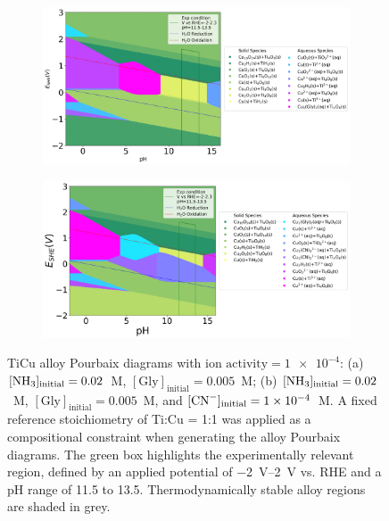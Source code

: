 \documentclass[journal=jacsat,manuscript=article]{achemso}
\begin{document}
\begin{figure}[htbp]
    \centering
    \begin{subfigure}[b]{0.45\textwidth}
        \subcaption{}\label{fig:TiCu_Pourbaix_NH3_Gly}
        \includegraphics[width=\textwidth]
        {Figures/alloy_pourbaix_diagrams/Ti_Cu_alloy_Ti0.5 Cu0.5_NH3=0.02M_Gly=0.005M_CN=0M_activity=1e-04M.png}
        \par\medskip
    \end{subfigure}
    \begin{subfigure}[b]{0.45\textwidth}
        \subcaption{}\label{fig:TiCu_Pourbaix_NH3_Gly_CN}
        \includegraphics[width=\textwidth]{Figures/alloy_pourbaix_diagrams/Ti_Cu_alloy_Ti0.5 Cu0.5_NH3=0.02M_Gly=0.005M_CN=0.0001M_activity=1e-04M.png}
        \par\medskip   
    \end{subfigure}
    \caption{TiCu alloy Pourbaix diagrams with $\text{ion activity} = \num{1e-4}$: (a) $[\ce{NH3}]_\text{initial} = 0.02$~M, $[\text{Gly}]_\text{initial} = 0.005$~M; (b) $[\ce{NH3}]_\text{initial} = 0.02$~M, $[\text{Gly}]_\text{initial} = 0.005$~M, and $[\ce{CN^-}]_\text{initial} = \num{1e-4}$~M. A fixed reference stoichiometry of Ti:Cu = 1:1 was applied as a compositional constraint when generating the alloy Pourbaix diagrams. The green box highlights the experimentally relevant region, defined by an applied potential of \SIrange{-2}{2}{V} vs. RHE and a pH range of 11.5 to 13.5. Thermodynamically stable alloy regions are shaded in grey.}
    \label{fig:TiCu_alloy_Pourbaix}
\end{figure}
\end{document}
